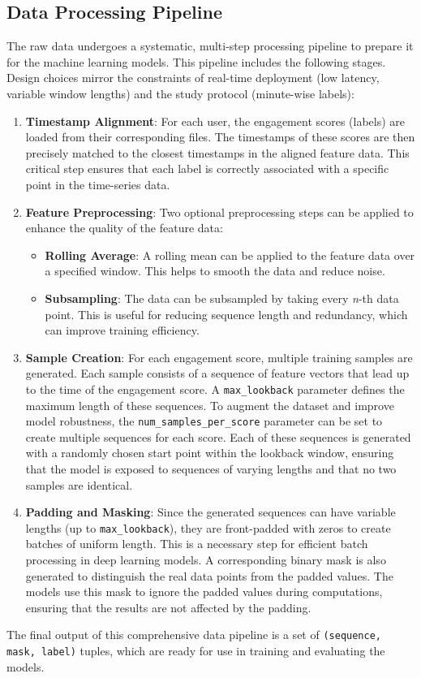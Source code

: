 \documentclass[review]{vgtc}                 %
\begin{document}
\subsection{Data Processing Pipeline}
The raw data undergoes a systematic, multi-step processing pipeline to prepare it for the machine learning models. This pipeline includes the following stages. Design choices mirror the constraints of real-time deployment (low latency, variable window lengths) and the study protocol (minute-wise labels):
\begin{enumerate}
    \item \textbf{Timestamp Alignment}: For each user, the engagement scores (labels) are loaded from their corresponding files. The timestamps of these scores are then precisely matched to the closest timestamps in the aligned feature data. This critical step ensures that each label is correctly associated with a specific point in the time-series data.
    \item \textbf{Feature Preprocessing}: Two optional preprocessing steps can be applied to enhance the quality of the feature data:
    \begin{itemize}
        \item \textbf{Rolling Average}: A rolling mean can be applied to the feature data over a specified window. This helps to smooth the data and reduce noise.
        \item \textbf{Subsampling}: The data can be subsampled by taking every \textit{n}-th data point. This is useful for reducing sequence length and redundancy, which can improve training efficiency.
    \end{itemize}
    \item \textbf{Sample Creation}: For each engagement score, multiple training samples are generated. Each sample consists of a sequence of feature vectors that lead up to the time of the engagement score. A \texttt{max\_lookback} parameter defines the maximum length of these sequences. To augment the dataset and improve model robustness, the \texttt{num\_samples\_per\_score} parameter can be set to create multiple sequences for each score. Each of these sequences is generated with a randomly chosen start point within the lookback window, ensuring that the model is exposed to sequences of varying lengths and that no two samples are identical.
    \item \textbf{Padding and Masking}: Since the generated sequences can have variable lengths (up to \texttt{max\_lookback}), they are front-padded with zeros to create batches of uniform length. This is a necessary step for efficient batch processing in deep learning models. A corresponding binary mask is also generated to distinguish the real data points from the padded values. The models use this mask to ignore the padded values during computations, ensuring that the results are not affected by the padding.
\end{enumerate}
The final output of this comprehensive data pipeline is a set of \texttt{(sequence, mask, label)} tuples, which are ready for use in training and evaluating the models.
\end{document}
